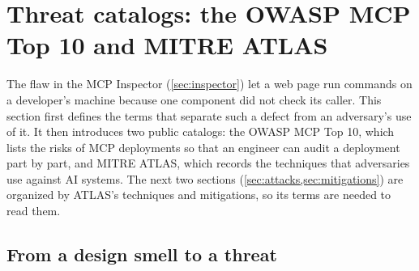 \section{Threat catalogs: the OWASP MCP Top 10 and MITRE ATLAS}
\label{sec:threats}

The flaw in the MCP Inspector (\cref{sec:inspector}) let a web page run commands on a developer's
machine because one component did not check its caller. This section first defines the terms that
separate such a defect from an adversary's use of it. It then introduces two public catalogs: the
OWASP MCP Top 10, which lists the risks of MCP deployments so that an engineer can audit a
deployment part by part, and MITRE ATLAS, which records the techniques that adversaries use against
AI systems. The next two sections (\cref{sec:attacks,sec:mitigations}) are organized by ATLAS's
techniques and mitigations, so its terms are needed to read them.

\subsection{From a design smell to a threat}
\label{sec:threats-terms}

